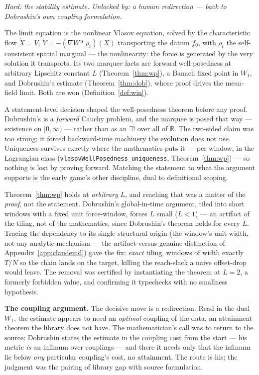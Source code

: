 \documentclass[11pt]{article}
\theoremstyle{plain}
\theoremstyle{definition}
\theoremstyle{remark}
\newcommand{\R}{\mathbb{R}}
\newcommand{\Wone}{W_1}
\newcommand{\lean}[1]{\texttt{#1}}
\begin{document}
\noindent\emph{Hard: the stability estimate. Unlocked by: a human redirection --- back to Dobrushin's own coupling formulation.}

The limit equation is the nonlinear Vlasov equation, solved by the characteristic
flow $\dot X = V$, $\dot V = -(\nabla W*\rho_t)(X)$ transporting the datum $f_0$,
with $\rho_t$ the self-consistent spatial marginal --- the nonlinearity: the force is
generated by the very solution it transports. Its two marquee facts are
forward well-posedness at arbitrary Lipschitz constant $L$ (Theorem~\ref{thm:wp}),
a Banach fixed point in $\Wone$, and Dobrushin's estimate (Theorem~\ref{thm:dob}),
whose proof drives the mean-field limit. Both are won (Definition~\ref{def:win}).

A statement-level decision shaped the well-posedness theorem before any proof.
Dobrushin's is a \emph{forward} Cauchy problem, and the marquee is posed that way ---
existence on $[0,\infty)$ --- rather than as an $\exists!$ over all of $\R$. The
two-sided claim was too strong: it forced backward-time machinery the evolution does
not use. Uniqueness survives exactly
where the mathematics puts it --- per window, in the Lagrangian class
(\lean{vlasovWellPosedness\_uniqueness}, Theorem~\ref{thm:wp}) --- so nothing is lost
by proving forward. Matching the statement to what the argument supports is the early
game's other discipline, dual to definitional scoping.

Theorem~\ref{thm:wp} holds at \emph{arbitrary} $L$, and reaching that was a matter of the
\emph{proof}, not the statement. Dobrushin's global-in-time argument, tiled into short windows with a fixed unit
force-window, forces $L$ small ($L<1$) --- an artifact of the tiling, not of the
mathematics, since Dobrushin's theorem holds for every $L$. Tracing the dependency to its single structural origin (the window's unit width,
not any analytic mechanism --- the artifact-versus-genuine distinction of
Appendix~\ref{app:claudemd}) gave the fix: \emph{exact} tiling, windows of width exactly
$T/N$ so the chain lands on the target, killing the reach-slack a naive
offset-drop would leave. The removal was certified by instantiating the
theorem at $L=2$, a formerly forbidden value, and confirming it typechecks with no smallness
hypothesis.

\medskip\noindent
\textbf{The coupling argument.} The decisive move is a redirection. Read in the dual
$\Wone$, the estimate appears to need an \emph{optimal} coupling of the data, an
attainment theorem the library does not have. The mathematician's call was to return
to the source: Dobrushin states the estimate in the coupling cost from the start ---
his metric \emph{is} an infimum over couplings \cite{Dobrushin} --- and there it needs
only that the infimum lie below \emph{any} particular coupling's cost, no attainment.
The route is his; the judgment was the pairing of library gap with source formulation.
\end{document}
